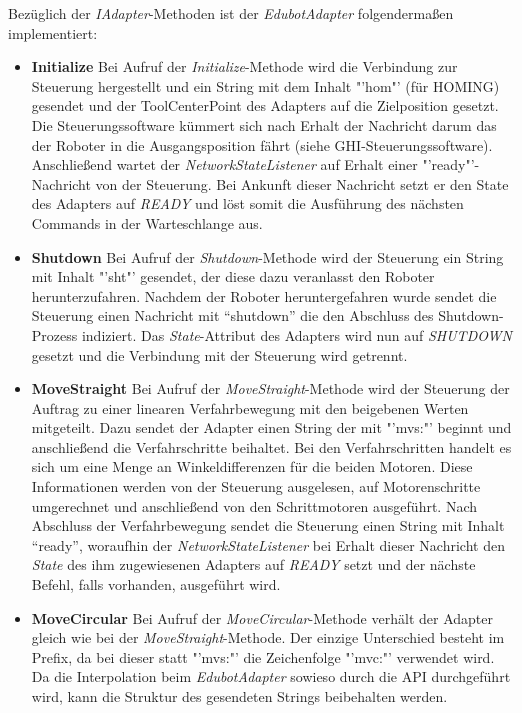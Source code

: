 Bezüglich der \textit{IAdapter}-Methoden ist der \textit{EdubotAdapter} folgendermaßen implementiert:
\begin{itemize}
\item \textbf{Initialize}
\newline
Bei Aufruf der \textit{Initialize}-Methode wird die Verbindung zur Steuerung hergestellt und ein String mit dem Inhalt "'hom"' (für HOMING) gesendet und der ToolCenterPoint des Adapters auf die Zielposition gesetzt. Die Steuerungssoftware kümmert sich nach Erhalt der Nachricht darum das der Roboter in die Ausgangsposition fährt (siehe GHI-Steuerungssoftware). Anschließend wartet der \textit{NetworkStateListener} auf Erhalt einer "'ready"'-Nachricht von der Steuerung. Bei Ankunft dieser Nachricht setzt er den State des Adapters auf \textit{READY} und löst somit die Ausführung des nächsten Commands in der Warteschlange aus.
\item \textbf{Shutdown}
\newline
Bei Aufruf der \textit{Shutdown}-Methode wird der Steuerung ein String mit Inhalt "'sht"' gesendet, der diese dazu veranlasst den Roboter herunterzufahren. Nachdem der Roboter heruntergefahren wurde sendet die Steuerung einen Nachricht mit “shutdown” die den Abschluss des Shutdown-Prozess indiziert. Das \textit{State}-Attribut des Adapters wird nun auf \textit{SHUTDOWN} gesetzt und die Verbindung mit der Steuerung wird getrennt.
\item \textbf{MoveStraight}
\newline
Bei Aufruf der \textit{MoveStraight}-Methode wird der Steuerung der Auftrag zu einer linearen Verfahrbewegung mit den beigebenen Werten mitgeteilt. Dazu sendet der Adapter einen String der mit "'mvs:"' beginnt und anschließend die Verfahrschritte beihaltet. Bei den Verfahrschritten handelt es sich um eine Menge an Winkeldifferenzen für die beiden Motoren. Diese Informationen werden von der Steuerung ausgelesen, auf Motorenschritte umgerechnet und anschließend von den Schrittmotoren ausgeführt. Nach Abschluss der Verfahrbewegung sendet die Steuerung einen String mit Inhalt “ready”, woraufhin der \textit{NetworkStateListener} bei Erhalt dieser Nachricht den \textit{State} des ihm zugewiesenen Adapters auf \textit{READY} setzt und der nächste Befehl, falls vorhanden, ausgeführt wird.
\item \textbf{MoveCircular}
\newline
Bei Aufruf der \textit{MoveCircular}-Methode verhält der Adapter gleich wie bei der \textit{MoveStraight}-Methode. Der einzige Unterschied besteht im Prefix, da bei dieser statt "'mvs:"' die Zeichenfolge "'mvc:"' verwendet wird. Da die Interpolation beim \textit{EdubotAdapter} sowieso durch die API durchgeführt wird, kann die Struktur des gesendeten Strings beibehalten werden.

\end{itemize}
